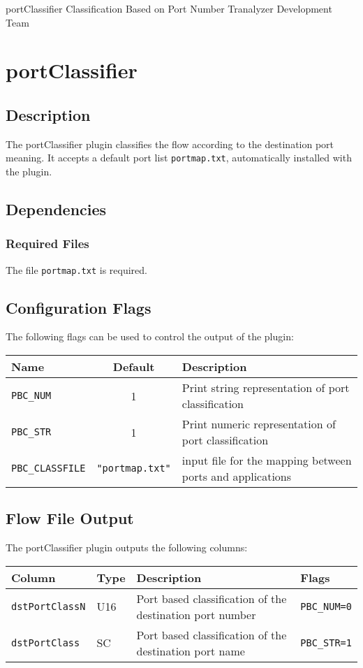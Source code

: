 \documentclass[documentation]{subfiles}
\begin{document}
\trantitle
    {portClassifier}
    {Classification Based on Port Number}
    {Tranalyzer Development Team} %

\section{portClassifier}\label{s:portClassifier}

\subsection{Description}
The portClassifier plugin classifies the flow according to the destination port meaning. It accepts a default port list {\tt portmap.txt}, automatically installed with the plugin.

\subsection{Dependencies}

\subsubsection{Required Files}
The file {\tt portmap.txt} is required.

\subsection{Configuration Flags}
The following flags can be used to control the output of the plugin:
\begin{longtable}{lcl}
    \toprule
    {\bf Name} & {\bf Default} & {\bf Description} \\
    \midrule\endhead%
    {\tt PBC\_NUM} & 1 & Print string representation of port classification\\
    {\tt PBC\_STR} & 1 & Print numeric representation of port classification\\
    {\tt PBC\_CLASSFILE} & {\tt\small "portmap.txt"} & input file for the mapping between ports and applications\\
    \bottomrule
\end{longtable}

\subsection{Flow File Output}
The portClassifier plugin outputs the following columns:
\begin{longtable}{llll}
    \toprule
    {\bf Column} & {\bf Type} & {\bf Description} & {\bf Flags}\\
    \midrule\endhead%
    {\tt dstPortClassN} & U16 & Port based classification of the destination port number & {\tt PBC\_NUM=0}\\
    {\tt dstPortClass}  & SC  & Port based classification of the destination port name   & {\tt PBC\_STR=1}\\
    \bottomrule
\end{longtable}
\end{document}

